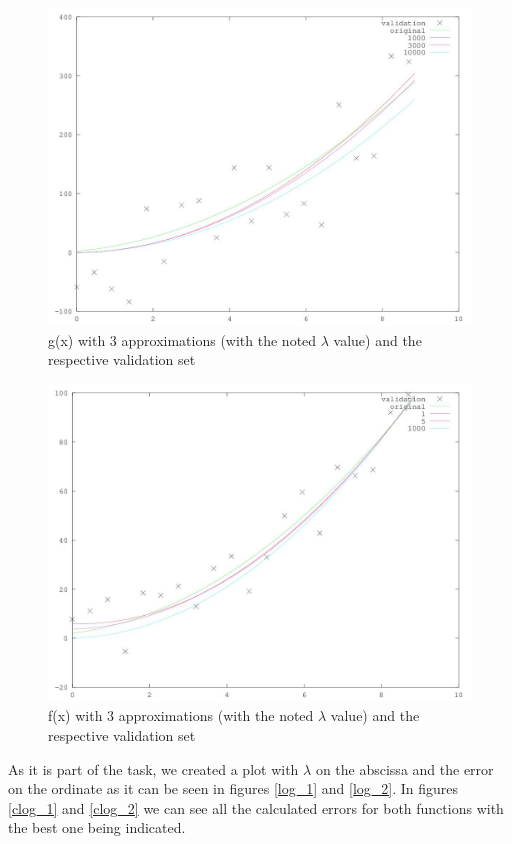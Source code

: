 \documentclass[12pt]{article}
\begin{document}
	\begin{figure}
		\centering
		\includegraphics[scale=0.5]{plot}
		\caption{g(x) with 3 approximations (with the noted $\lambda$ value) and the respective validation set}
		\label{fig:small_g_plot}
	\end{figure}

	\begin{figure}
		\centering
		\includegraphics[scale=0.5]{small_f_plot}
		\caption{f(x) with 3 approximations (with the noted $\lambda$ value) and the respective validation set}
		\label{fig:small_f_plot}
	\end{figure}
 
As it is part of the task, we created a plot with $\lambda$ on the abscissa and the error on the ordinate as it can be seen in figures \ref{log_1} and \ref{log_2}. 
In figures \ref{clog_1} and \ref{clog_2} we can see all the calculated errors for both functions with the best one being indicated.
\end{document}
